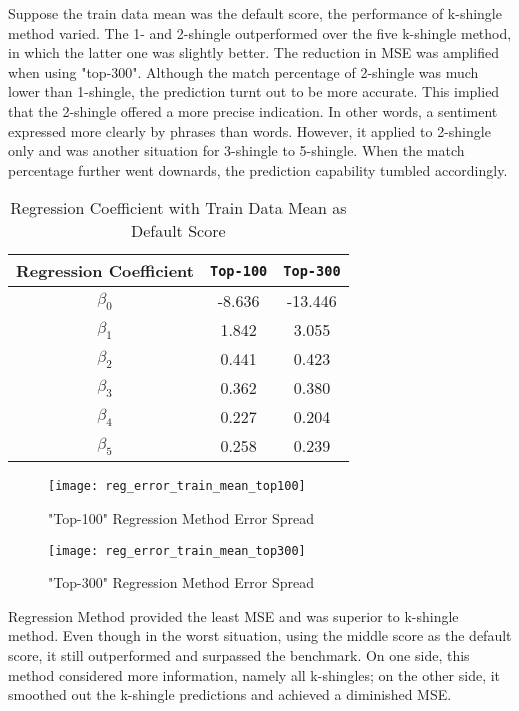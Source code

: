 Suppose the train data mean was the default score, the performance of k-shingle method varied. The 1- and 2-shingle outperformed over the five k-shingle method, in which the latter one was slightly better. The reduction in MSE was amplified when using "top-300". Although the match percentage of 2-shingle was much lower than 1-shingle, the prediction turnt out to be more accurate. This implied that the 2-shingle offered a more precise indication. In other words, a sentiment expressed more clearly by phrases than words.
However, it applied to 2-shingle only and was another situation for 3-shingle to 5-shingle. When the match percentage further went downards, the prediction capability tumbled accordingly. 

\begin{table}[H]

\caption{Regression Coefficient with Train Data Mean as Default Score}
	\begin{tabular}{ccc}
			\toprule
				Regression Coefficient & \texttt{Top-100} &  \texttt{Top-300} \\
			\midrule
				 $\beta_0$ & -8.636 & -13.446\\
				 $\beta_1$ & 1.842 & 3.055\\
				 $\beta_2$ & 0.441 & 0.423\\
				 $\beta_3$ & 0.362 & 0.380\\
				 $\beta_4$ & 0.227 & 0.204\\
				 $\beta_5$ & 0.258 & 0.239\\
				

			\bottomrule
		\end{tabular}

\end{table}

\begin{figure}
\texttt{[image: reg\_error\_train\_mean\_top100]}
\caption{"Top-100" Regression Method Error Spread}
\end{figure}

\begin{figure}
\texttt{[image: reg\_error\_train\_mean\_top300]}
\caption{"Top-300" Regression Method Error Spread}
\end{figure}

Regression Method provided the least MSE and was superior to k-shingle method. Even though in the worst situation, using the middle score as the default score, it still outperformed and surpassed the benchmark. On one side, this method considered more information, namely all k-shingles; on the other side, it smoothed out the k-shingle predictions and achieved a diminished MSE.\\

